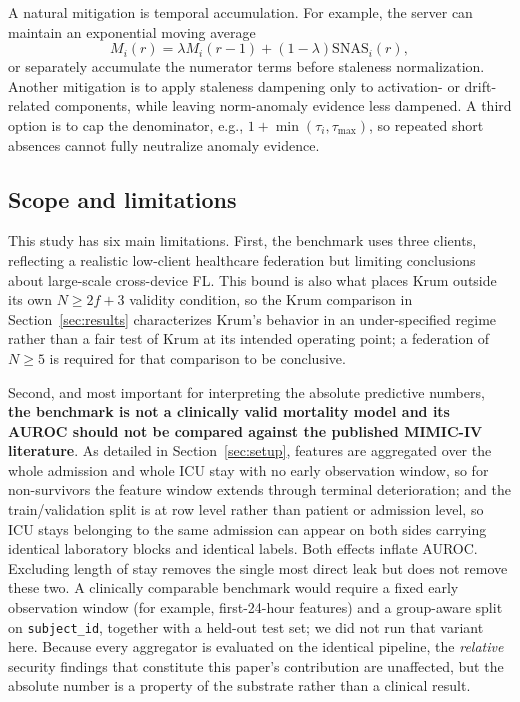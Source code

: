 \documentclass[pdflatex,sn-mathphys-num]{sn-jnl}
\begin{document}
A natural mitigation is temporal accumulation. For example, the server can maintain an exponential moving average
\begin{equation}
    M_i(r) = \lambda M_i(r-1) + (1-\lambda)\mathrm{SNAS}_i(r),
\end{equation}
or separately accumulate the numerator terms before staleness normalization. Another mitigation is to apply staleness dampening only to activation- or drift-related components, while leaving norm-anomaly evidence less dampened. A third option is to cap the denominator, e.g., $1+\min(\tau_i,\tau_{\max})$, so repeated short absences cannot fully neutralize anomaly evidence.

\subsection{Scope and limitations}\label{sec:limitations}

This study has six main limitations. First, the benchmark uses three clients, reflecting a realistic low-client healthcare federation but limiting conclusions about large-scale cross-device FL. This bound is also what places Krum outside its own $N\geq2f+3$ validity condition, so the Krum comparison in Section~\ref{sec:results} characterizes Krum's behavior in an under-specified regime rather than a fair test of Krum at its intended operating point; a federation of $N\geq5$ is required for that comparison to be conclusive.

Second, and most important for interpreting the absolute predictive numbers, \textbf{the benchmark is not a clinically valid mortality model and its AUROC should not be compared against the published MIMIC-IV literature}. As detailed in Section~\ref{sec:setup}, features are aggregated over the whole admission and whole ICU stay with no early observation window, so for non-survivors the feature window extends through terminal deterioration; and the train/validation split is at row level rather than patient or admission level, so ICU stays belonging to the same admission can appear on both sides carrying identical laboratory blocks and identical labels. Both effects inflate AUROC. Excluding length of stay removes the single most direct leak but does not remove these two. A clinically comparable benchmark would require a fixed early observation window (for example, first-24-hour features) and a group-aware split on \texttt{subject\_id}, together with a held-out test set; we did not run that variant here. Because every aggregator is evaluated on the identical pipeline, the \emph{relative} security findings that constitute this paper's contribution are unaffected, but the absolute number is a property of the substrate rather than a clinical result.
\end{document}
